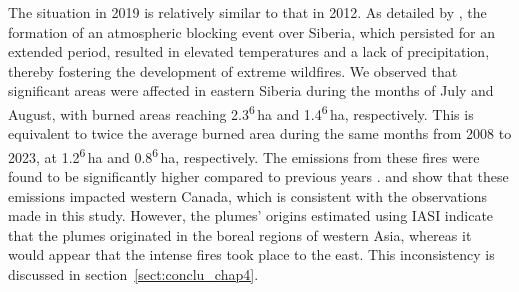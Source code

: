 \documentclass[acp, manuscript]{copernicus}
\begin{document}


The situation in 2019 is relatively similar to that in 2012. As detailed by \citet{bondurSatelliteMonitoringSiberian2020a}, the formation of an atmospheric blocking event over Siberia, which persisted for an extended period, resulted in elevated temperatures and a lack of precipitation, thereby fostering the development of extreme wildfires.
We observed that significant areas were affected in eastern Siberia during the months of July and August, with burned areas reaching 2.3\textsuperscript{6}\,ha and 1.4\textsuperscript{6}\,ha, respectively. This is equivalent to twice the average burned area during the same months from 2008 to 2023, at 1.2\textsuperscript{6}\,ha and 0.8\textsuperscript{6}\,ha, respectively. 
The emissions from these fires were found to be significantly higher compared to previous years \citep{voronovaAnomalousWildfiresSiberia2020}. \citet{johnsonLongrangeTransportSiberian2021} and \citet{kostrykinBlackCarbonEmissions2021} show that these emissions impacted western Canada, which is consistent with the observations made in this study. However, the plumes' origins estimated using IASI indicate that the plumes originated in the boreal regions of western Asia, whereas it would appear that the intense fires took place to the east. This inconsistency is discussed in section~\ref{sect:conclu_chap4}.


\end{document}
